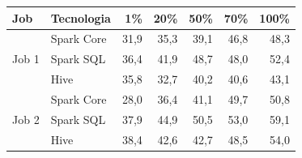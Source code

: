 \begin{tabular}{@{}l l rrrrr@{}}
\toprule
Job & Tecnologia & 1\% & 20\% & 50\% & 70\% & 100\% \\
\midrule
\multirow{3}{*}{Job 1} & Spark Core & 31,9 & 35,3 & 39,1 & 46,8 & 48,3 \\
 & Spark SQL & 36,4 & 41,9 & 48,7 & 48,0 & 52,4 \\
 & Hive & 35,8 & 32,7 & 40,2 & 40,6 & 43,1 \\
\midrule
\multirow{3}{*}{Job 2} & Spark Core & 28,0 & 36,4 & 41,1 & 49,7 & 50,8 \\
 & Spark SQL & 37,9 & 44,9 & 50,5 & 53,0 & 59,1 \\
 & Hive & 38,4 & 42,6 & 42,7 & 48,5 & 54,0 \\
\bottomrule
\end{tabular}